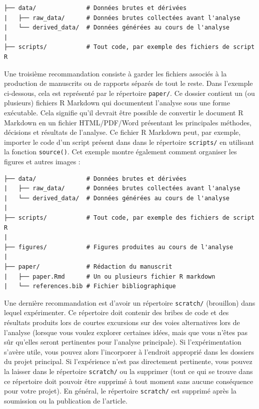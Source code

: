 \documentclass[
  french,
]{scrbook}
\begin{document}
\begin{verbatim}
├── data/              # Données brutes et dérivées
|   ├── raw_data/      # Données brutes collectées avant l'analyse
|   └── derived_data/  # Données générées au cours de l'analyse
|
├── scripts/           # Tout code, par exemple des fichiers de script R
\end{verbatim}

Une troisième recommandation consiste à garder les fichiers associés à la production de manuscrits ou de rapports séparés de tout le reste. Dans l'exemple ci-dessous, cela est représenté par le répertoire \texttt{paper/}. Ce dossier contient un (ou plusieurs) fichiers R Markdown qui documentent l'analyse sous une forme exécutable. Cela signifie qu'il devrait être possible de convertir le document R Markdown en un fichier HTML/PDF/Word présentant les principales méthodes, décisions et résultats de l'analyse. Ce fichier R Markdown peut, par exemple, importer le code d'un script présent dans dans le répertoire \texttt{scripts/} en utilisant la fonction \texttt{source()}. Cet exemple montre également comment organiser les figures et autres images :

\begin{verbatim}
├── data/              # Données brutes et dérivées
|   ├── raw_data/      # Données brutes collectées avant l'analyse
|   └── derived_data/  # Données générées au cours de l'analyse
|
├── scripts/           # Tout code, par exemple des fichiers de script R
|
├── figures/           # Figures produites au cours de l'analyse
|
├── paper/             # Rédaction du manuscrit
|   ├── paper.Rmd      # Un ou plusieurs fichier R markdown
|   └── references.bib # Fichier bibliographique
\end{verbatim}

Une dernière recommandation est d'avoir un répertoire \texttt{scratch/} (brouillon) dans lequel expérimenter. Ce répertoire doit contenir des bribes de code et des résultats produits lors de courtes excursions sur des voies alternatives lors de l'analyse (lorsque vous voulez explorer certaines idées, mais que vous n'êtes pas sûr qu'elles seront pertinentes pour l'analyse principale). Si l'expérimentation s'avère utile, vous pouvez alors l'incorporer à l'endroit approprié dans les dossiers du projet principal. Si l'expérience n'est pas directement pertinente, vous pouvez la laisser dans le répertoire \texttt{scratch/} ou la supprimer (tout ce qui se trouve dans ce répertoire doit pouvoir être supprimé à tout moment sans aucune conséquence pour votre projet). En général, le répertoire \texttt{scratch/} est supprimé après la soumission ou la publication de l'article.
\end{document}
